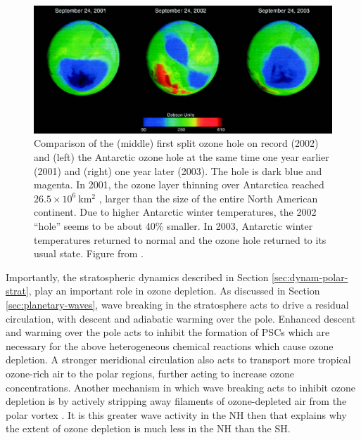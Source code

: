 
\begin{figure}
 \centering
 \noindent\includegraphics[width=\textwidth]{figures/chapter-intro/2002_SSW.png}
 \caption[]{Comparison of the (middle) first split ozone hole on record (2002)
   and (left) the Antarctic ozone hole at the same time one year earlier (2001)
   and (right) one year later (2003). The hole is dark blue and magenta. In
   2001, the ozone layer thinning over Antarctica reached
   $26.5 \times 10^6~\mathrm{km^2}$ , larger than the size of the entire North
   American continent. Due to higher Antarctic winter temperatures, the 2002
   ``hole'' seems to be about 40\% smaller. In 2003, Antarctic winter
   temperatures returned to normal and the ozone hole returned to its usual
   state. Figure from \citet{Shepherd2005}.}
 \label{fig:2002_SSW}
\end{figure}

Importantly, the stratospheric dynamics described in Section
\ref{sec:dynam-polar-strat}, play an important role in ozone depletion. As
discussed in Section \ref{sec:planetary-waves}, wave breaking in the
stratosphere acts to drive a residual circulation, with descent and adiabatic
warming over the pole. Enhanced descent and warming over the pole acts to
inhibit the formation of PSCs which are necessary for the above heterogeneous
chemical reactions which cause ozone depletion. A stronger meridional
circulation also acts to transport more tropical ozone-rich air to the polar
regions, further acting to increase ozone concentrations. Another mechanism in
which wave breaking acts to inhibit ozone depletion is by actively stripping
away filaments of ozone-depleted air from the polar vortex \citep{Waugh1994}. It
is this greater wave activity in the NH then that explains why the extent of
ozone depletion is much less in the NH than the SH.

